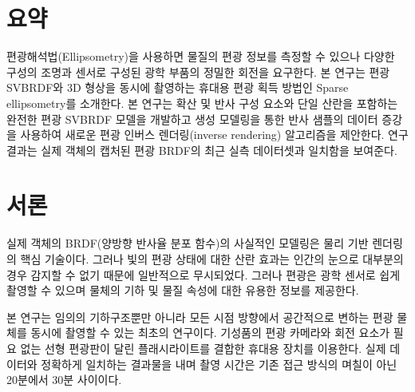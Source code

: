 \documentclass[a4paper,twocolumn]{article}
\begin{document}

\section*{요약}
\label{sec:abstrct}
	편광해석법(Ellipsometry)을 사용하면 물질의 편광 정보를 측정할 수 있으나 다양한 구성의 조명과 센서로 구성된 광학 부품의 정밀한 회전을 요구한다. 
	본 연구는 편광 SVBRDF와 3D 형상을 동시에 촬영하는 휴대용 편광 획득 방법인 Sparse ellipsometry를 소개한다. 
	본 연구는 확산 및 반사 구성 요소와 단일 산란을 포함하는 완전한 편광 SVBRDF 모델을 개발하고 생성 모델링을 통한 반사 샘플의 데이터 증강을 사용하여 새로운 편광 인버스 렌더링(inverse rendering) 알고리즘을 제안한다. 연구 결과는 실제 객체의 캡처된 편광 BRDF의 최근 실측 데이터셋과 일치함을 보여준다.
	

\section{서론}
\label{sec:introduction}
실제 객체의 BRDF(양방향 반사율 분포 함수)의 사실적인 모델링은 물리 기반 렌더링의 핵심 기술이다.
그러나 빛의 편광 상태에 대한 산란 효과는 인간의 눈으로 대부분의 경우 감지할 수 없기 때문에 일반적으로 무시되었다.
그러나 편광은 광학 센서로 쉽게 촬영할 수 있으며 물체의 기하 및 물질 속성에 대한 유용한 정보를 제공한다.

본 연구는 임의의 기하구조뿐만 아니라 모든 시점 방향에서 공간적으로 변하는 편광 물체를 동시에 촬영할 수 있는 최초의 연구이다. 기성품의 편광 카메라와 회전 요소가 필요 없는 선형 편광판이 달린 플래시라이트를 결합한 휴대용 장치를 이용한다. 
실제 데이터와 정확하게 일치하는 결과물을 내며 촬영 시간은 기존 접근 방식의 며칠이 아닌 20분에서 30분 사이이다.
\end{document}
